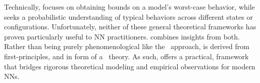 \noindent
Technically, \SLT focuses on obtaining bounds on a model’s worst-case behavior, while \STATMECH seeks a probabilistic understanding of typical behaviors across different states or configurations.
Unfortunately, neither of these general theoretical frameworks has proven particularly useful to NN practitioners.
\SETOL combines insights from both.
Rather than being purely phenomenological like the \HTSR~approach, \SETOL is derived from first-principles, and in form of a \SemiEmpirical~theory.
As such, \SETOL offers a practical, \SemiEmpirical framework that bridges rigorous theoretical modeling and empirical observations for modern NNs.



